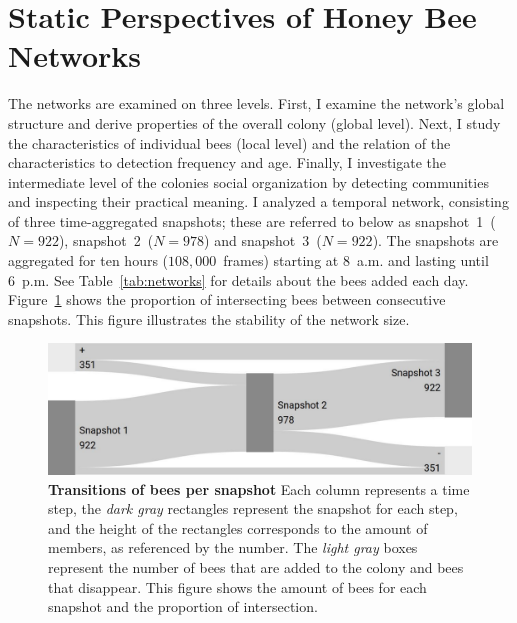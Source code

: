 \section{Static Perspectives of Honey Bee Networks}
\label{sec:staticResults}
The networks are examined on three levels.
First, I examine the network's global structure and derive properties of the overall colony (global level).
Next, I study the characteristics of individual bees (local level) and the relation of the characteristics to detection frequency and age.
Finally, I investigate the intermediate level of the colonies social organization by detecting communities and inspecting their practical meaning.
I analyzed a temporal network, consisting of three time-aggregated snapshots; these are referred to below as snapshot~1~($N = 922$), snapshot~2~($N = 978$) and snapshot~3~($N = 922$).
The snapshots are aggregated for ten hours ($108,000$~frames) starting at 8~a.m. and lasting until 6~p.m.
See Table~\ref{tab:networks} for details about the bees added each day. Figure~\ref{fig:network-matching} shows the proportion of intersecting bees between consecutive snapshots.
This figure illustrates the stability of the network size.




\begin{figure}[htb]
	\centering
	\includegraphics[width=1.0\textwidth]{Figures/network_matching}
	\caption[Transitions of bees per snapshot]{
	\textbf{Transitions of bees per snapshot}
	Each column represents a time step, the \emph{dark gray} rectangles represent the snapshot for each step, and the height of the rectangles corresponds to the amount of members, as referenced by the number.
	The \emph{light gray} boxes represent the number of bees that are added to the colony and bees that disappear.
	This figure shows the amount of bees for each snapshot and the proportion of intersection.}
	\label{fig:network-matching}
\end{figure}






